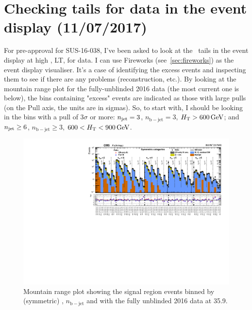 
\chapter{Checking \texorpdfstring{\htmiss}{HTmiss} tails for data in the event display (11/07/2017)}

For pre-approval for SUS-16-038, I've been asked to look at the \htmiss\ tails in the event display at high \HT, LT, for data. I can use Fireworks (see~\ref{sec:fireworks}) as the event display visualiser. It's a case of identifying the excess events and inspecting them to see if there are any problems (reconstruction, etc.). By looking at the mountain range plot for the fully-unblinded 2016 data (the most current one is below), the bins containing "excess" events are indicated as those with large pulls (on the Pull axis, the units are in sigmas). So, to start with, I should be looking in the bins with a pull of 3$\sigma$ or more: $n_{\mathrm{jet}} = 3$, $n_{\mathrm{b-jet}} = 3$, $H_{\mathrm{T}} > 600\,\text{G\text{e\kern-0.15ex V}}$; and $n_{\mathrm{jet}} \geq 6$, $n_{\mathrm{b-jet}} \geq 3$, $600 < H_{\mathrm{T}} < 900\,\text{G\text{e\kern-0.15ex V}}$.

\begin{figure}[H]
\centering
\includegraphics[width=\textwidth]{./sec27/summaryPlot_Symmetric_prefit_overlay_fit_b.pdf}
\caption{Mountain range plot showing the signal region events binned by (symmetric) \njet, $n_{\mathrm{b-jet}}$ and \HT with the fully unblinded 2016 data at 35.9\fbinv. }
\end{figure}

